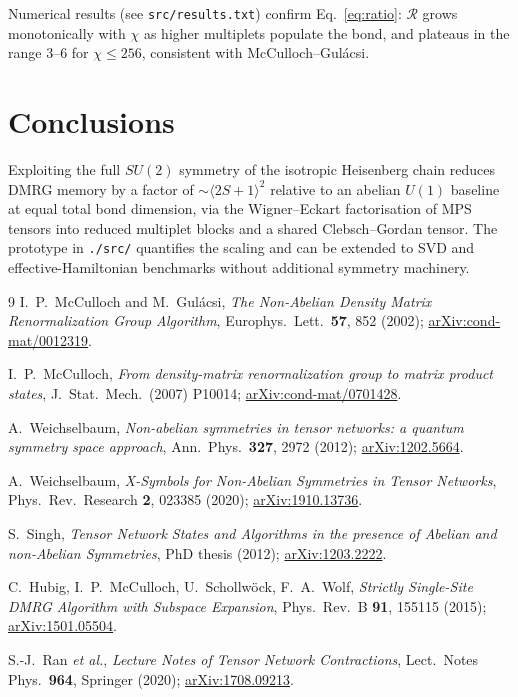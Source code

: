 \documentclass[11pt,a4paper]{article}
\begin{document}
Numerical results (see \texttt{src/results.txt}) confirm Eq.~\eqref{eq:ratio}: $\mathcal R$ grows monotonically with $\chi$ as higher multiplets populate the bond, and plateaus in the range $3$--$6$ for $\chi \le 256$, consistent with McCulloch--Gul\'acsi.

\section{Conclusions}

Exploiting the full $SU(2)$ symmetry of the isotropic Heisenberg chain reduces DMRG memory by a factor of $\sim \langle 2S+1\rangle^{2}$ relative to an abelian $U(1)$ baseline at equal total bond dimension, via the Wigner--Eckart factorisation of MPS tensors into reduced multiplet blocks and a shared Clebsch--Gordan tensor. The prototype in \texttt{./src/} quantifies the scaling and can be extended to SVD and effective-Hamiltonian benchmarks without additional symmetry machinery.

\begin{thebibliography}{9}
I.~P.~McCulloch and M.~Gul\'acsi,
\emph{The Non-Abelian Density Matrix Renormalization Group Algorithm},
Europhys.\ Lett.\ \textbf{57}, 852 (2002);
\href{https://arxiv.org/abs/cond-mat/0012319}{arXiv:cond-mat/0012319}.

I.~P.~McCulloch,
\emph{From density-matrix renormalization group to matrix product states},
J.\ Stat.\ Mech.\ (2007) P10014;
\href{https://arxiv.org/abs/cond-mat/0701428}{arXiv:cond-mat/0701428}.

A.~Weichselbaum,
\emph{Non-abelian symmetries in tensor networks: a quantum symmetry space approach},
Ann.\ Phys.\ \textbf{327}, 2972 (2012);
\href{https://arxiv.org/abs/1202.5664}{arXiv:1202.5664}.

A.~Weichselbaum,
\emph{X-Symbols for Non-Abelian Symmetries in Tensor Networks},
Phys.\ Rev.\ Research \textbf{2}, 023385 (2020);
\href{https://arxiv.org/abs/1910.13736}{arXiv:1910.13736}.

S.~Singh,
\emph{Tensor Network States and Algorithms in the presence of Abelian and non-Abelian Symmetries},
PhD thesis (2012);
\href{https://arxiv.org/abs/1203.2222}{arXiv:1203.2222}.

C.~Hubig, I.~P.~McCulloch, U.~Schollw\"ock, F.~A.~Wolf,
\emph{Strictly Single-Site DMRG Algorithm with Subspace Expansion},
Phys.\ Rev.\ B \textbf{91}, 155115 (2015);
\href{https://arxiv.org/abs/1501.05504}{arXiv:1501.05504}.

S.-J.~Ran \emph{et al.},
\emph{Lecture Notes of Tensor Network Contractions},
Lect.\ Notes Phys.\ \textbf{964}, Springer (2020);
\href{https://arxiv.org/abs/1708.09213}{arXiv:1708.09213}.
\end{thebibliography}
\end{document}
